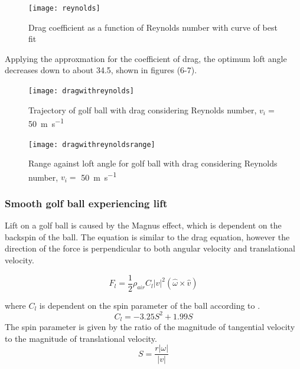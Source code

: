 \documentclass[12pt]{article}
\begin{document}
\begin{figure}[H]
\centering
\caption{Drag coefficient as a function of Reynolds number with curve of best fit}
\texttt{[image: reynolds]}
\end{figure}

Applying the approxmation for the coefficient of drag, the optimum loft angle decreases down to about 34.5\degree, shown in figures (6-7).
\begin{figure}[H]
\centering
\caption{Trajectory of golf ball with drag considering Reynolds number, $v_i=$ \SI{50}{\metre\per\second}}
\texttt{[image: dragwithreynolds]}
\end{figure}

\begin{figure}[H]
\centering
\caption{Range against loft angle for golf ball with drag considering Reynolds number, $v_i=$ \SI{50}{\metre\per\second}}
\texttt{[image: dragwithreynoldsrange]}
\end{figure}


\subsubsection{Smooth golf ball experiencing lift}
Lift on a golf ball is caused by the Magnus effect, which is dependent on the backspin of the ball. The equation is similar to the drag equation, however the direction of the force is perpendicular to both angular velocity and translational velocity.

\begin{equation} \label{lifteqn}
F_l = \frac{1}{2} \rho_{air} C_{l} |v|^2 (\hat{\omega} \times \hat{v})
\end{equation}

where $C_l$ is dependent on the spin parameter of the ball according to \cite{Bearman1976}.
\begin{equation} \label{clifteqn}
C_l = -3.25 S^2 + 1.99 S
\end{equation}
The spin parameter is given by the ratio of the magnitude of tangential velocity to the magnitude of translational velocity.
\begin{equation} \label{spineqn}
S = \frac{r|\omega|}{|v|}
\end{equation}


{}


\pagebreak

\end{document}
